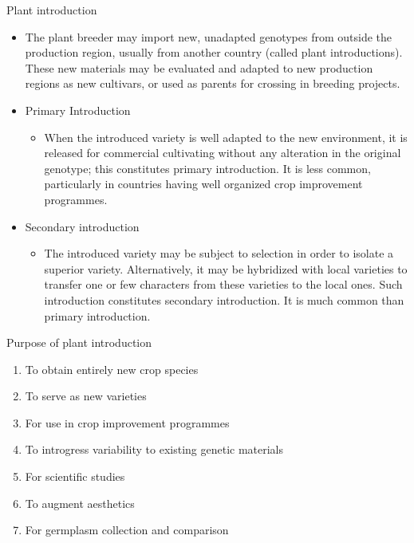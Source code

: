 \documentclass[11pt,ignorenonframetext,aspectratio=169]{beamer}
\providecommand{\tightlist}{%
  \setlength{\itemsep}{0pt}\setlength{\parskip}{0pt}}
\begin{document}
\begin{frame}{Plant introduction}
\protect\hypertarget{plant-introduction}{}
\begin{itemize}
\item
  The plant breeder may import new, unadapted genotypes from outside the
  production region, usually from another country (called plant
  introductions). These new materials may be evaluated and adapted to
  new production regions as new cultivars, or used as parents for
  crossing in breeding projects.
\item
  Primary Introduction

  \begin{itemize}
  \tightlist
  \item
    When the introduced variety is well adapted to the new environment,
    it is released for commercial cultivating without any alteration in
    the original genotype; this constitutes primary introduction. It is
    less common, particularly in countries having well organized crop
    improvement programmes.
  \end{itemize}
\item
  Secondary introduction

  \begin{itemize}
  \tightlist
  \item
    The introduced variety may be subject to selection in order to
    isolate a superior variety. Alternatively, it may be hybridized with
    local varieties to transfer one or few characters from these
    varieties to the local ones. Such introduction constitutes secondary
    introduction. It is much common than primary introduction.
  \end{itemize}
\end{itemize}
\end{frame}

\begin{frame}{Purpose of plant introduction}
\protect\hypertarget{purpose-of-plant-introduction}{}
\begin{enumerate}
\tightlist
\item
  To obtain entirely new crop species
\item
  To serve as new varieties
\item
  For use in crop improvement programmes
\item
  To introgress variability to existing genetic materials
\item
  For scientific studies
\item
  To augment aesthetics
\item
  For germplasm collection and comparison
\end{enumerate}
\end{frame}
\end{document}
